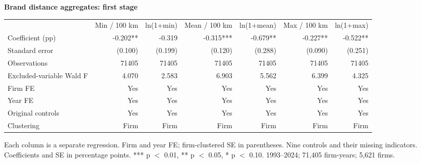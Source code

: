 \documentclass[10pt]{article}
\begin{document}
\setlength{\tabcolsep}{4pt}\renewcommand{\arraystretch}{1.1}
\noindent\textbf{Brand distance aggregates: first stage}\par\medskip
\begin{tabular}{lrrrrrr}
\hline
 & Min / 100 km & ln(1+min) & Mean / 100 km & ln(1+mean) & Max / 100 km & ln(1+max) \\
Coefficient (pp) & -0.202** & -0.319 & -0.315*** & -0.679** & -0.227** & -0.522** \\
Standard error & (0.100) & (0.199) & (0.120) & (0.288) & (0.090) & (0.251) \\
Observations & 71405 & 71405 & 71405 & 71405 & 71405 & 71405 \\
Excluded-variable Wald F & 4.070 & 2.583 & 6.903 & 5.562 & 6.399 & 4.325 \\
Firm FE & Yes & Yes & Yes & Yes & Yes & Yes \\
Year FE & Yes & Yes & Yes & Yes & Yes & Yes \\
Original controls & Yes & Yes & Yes & Yes & Yes & Yes \\
Clustering & Firm & Firm & Firm & Firm & Firm & Firm \\
\hline
\end{tabular}

\par\medskip\noindent\begin{minipage}{26cm}Each column is a separate regression. Firm and year FE; firm-clustered SE in parentheses. Nine controls and their missing indicators. Coefficients and SE in percentage points. *** p $<$ 0.01, ** p $<$ 0.05, * p $<$ 0.10. 1993--2024; 71,405 firm-years; 5,621 firms.\end{minipage}
\end{document}
